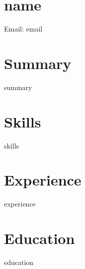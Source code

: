 \documentclass{article}
\begin{document}
\section*{{name}}

Email: {{email}}

\section*{Summary}
{{summary}}

\section*{Skills}
{{skills}}

\section*{Experience}
{{experience}}

\section*{Education}
{{education}}
\end{document}
